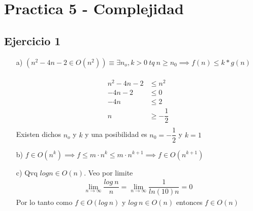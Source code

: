 \documentclass{article}
\begin{document}
\section*{Practica 5 - Complejidad\\}
\subsection*{Ejercicio 1\\}
\begin{itemize}
    \item [a) ] $(n^2-4n-2 \in O(n^2))\equiv \exists n_o,k >0\ tq\ n\geq n_0 \implies f(n)\leq k*g(n)$\\\\
    \begin{align}
        n^2-4n-2 &\leq n^2\\
        -4n-2 &\leq 0\\
        -4n &\leq 2\\
        n &\geq -\dfrac{1}{2}\\ 
    \end{align}
    Existen dichos $n_o$ y $k$ y una posibilidad es $n_0= -\dfrac{1}{2}$ y $k=1$

    \item [b) ] $f\in O(n^k) \implies f\leq m\cdot n^k\leq m\cdot n^{k+1} \implies \boxed{f\in O(n^{k+1})}$

    \item [c) ] Qvq $log n \in O(n)$. Veo por limite
    \setcounter{equation}{0}
    \begin{align}
        \lim_{n\to\infty}\dfrac{log\ n}{n}=\lim_{n\to\infty}\dfrac{1}{ln(10)n}=0
    \end{align}
    Por lo tanto como $f\in O(log\ n)$ y $log\ n \in O(n)$ entonces $f\in O(n)$
\end{itemize}
\end{document}
